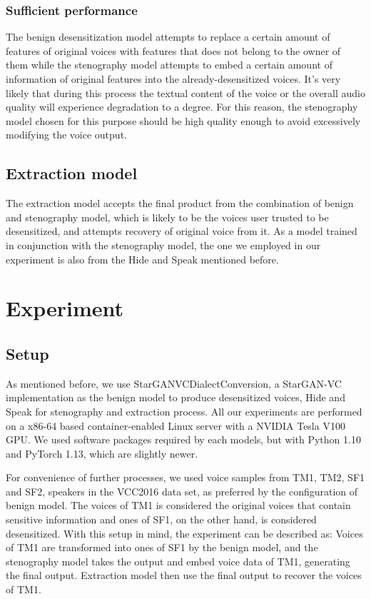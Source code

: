 \documentclass[journal]{IEEEtran} %
\begin{document}
\subsubsection{Sufficient performance}

The benign desensitization model attempts to replace a certain amount of features of original voices with features that does not belong to the owner of them while the stenography model attempts to embed a certain amount of information of original features into the already-desensitized voices. It's very likely that during this process the textual content of the voice or the overall audio quality will experience degradation to a degree. For this reason, the stenography model chosen for this purpose should be high quality enough to avoid excessively modifying the voice output.

\subsection{Extraction model}

The extraction model accepts the final product from the combination of benign and stenography model, which is likely to be the voices user trusted to be desensitized, and attempts recovery of original voice from it. As a model trained in conjunction with the stenography model, the one we employed in our experiment is also from the Hide and Speak mentioned before.

\section{Experiment}

\subsection{Setup}

As mentioned before, we use StarGANVCDialectConversion, a StarGAN-VC implementation as the benign model to produce desensitized voices, Hide and Speak for stenography and extraction process. All our experiments are performed on a x86-64 based container-enabled Linux server with a NVIDIA Tesla V100 GPU. We used software packages required by each models, but with Python 1.10 and PyTorch 1.13, which are slightly newer.

 For convenience of further processes, we used voice samples from TM1, TM2, SF1 and SF2, speakers in the VCC2016 data set, as preferred by the configuration of benign model. The voices of TM1 is considered the original voices that contain sensitive information and ones of SF1, on the other hand, is considered desensitized. With this setup in mind, the experiment can be described as: Voices of TM1 are transformed into ones of SF1 by the benign model, and the stenography model takes the output and embed voice data of TM1, generating the final output. Extraction model then use the final output to recover the voices of TM1.
\end{document}
